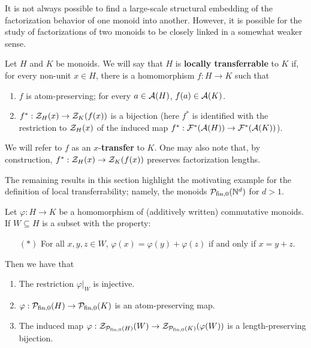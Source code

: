It is not always possible to find a large-scale structural embedding of the factorization behavior of one monoid into another.  
However, it is possible for the study of factorizations of two monoids to be closely linked in a somewhat weaker sense.

\begin{defn} \label{def:local transfer}
Let $H$ and $K$ be monoids. 
We will say that $H$ is \textbf{locally transferrable} to $K$ if, for every non-unit $x\in H$, there is a homomorphism $f: H \to K$ such that 
\begin{enumerate}[label={\rm (\roman{*})}]
	\item $f$ is atom-preserving; for every $a\in \mathcal{A}(H)$, $f(a)\in \mathcal{A}(K)$.
	\item $f^*:\mathcal{Z}_H(x) \to \mathcal{Z}_K(f(x))$ is a bijection (here $f^*$ is identified with the restriction to $\mathcal{Z}_H(x)$ of the induced map $f^*: \mathcal{F}^*(\mathcal{A}(H)) \to \mathcal{F}^*(\mathcal{A}(K))$).
\end{enumerate}
We will refer to $f$ as an $x$-\textbf{transfer} to $K$.
One may also note that, by construction, $f^*:\mathcal{Z}_H(x) \to \mathcal{Z}_K(f(x))$ preserves factorization lengths.
\end{defn}

The remaining results in this section highlight the motivating example for the definition of local transferrability; namely, the monoids $\mathcal{P}_{\textrm{fin}, 0}(\mathbb{N}^d)$ for $d>1$.

\begin{lemma}\label{lem:local-transport}
Let $\varphi: H \to K$ be a homomorphism of (additively written) commutative monoids. 
If $W\subseteq H$ is a subset with the property:
\begin{itemize}
\item[$(*)$] For all $x,y,z\in W$, $\varphi(x) = \varphi(y) + \varphi(z)$ if and only if $x = y + z$.
\end{itemize}
Then we have that
\begin{enumerate}[label={\rm (\roman{*})}]
\item The restriction $\varphi|_W$ is injective.
\item $\varphi:\mathcal{P}_{\textrm{fin}, 0}(H) \to \mathcal{P}_{\textrm{fin}, 0}(K)$ is an atom-preserving map.
\item The induced map $\varphi:\mathcal{Z}_{\mathcal{P}_{\textrm{fin}, 0}(H)}(W) \to \mathcal{Z}_{\mathcal{P}_{\textrm{fin}, 0}(K)}(\varphi(W))$ is a length-preserving bijection.
\end{enumerate}
\end{lemma}

